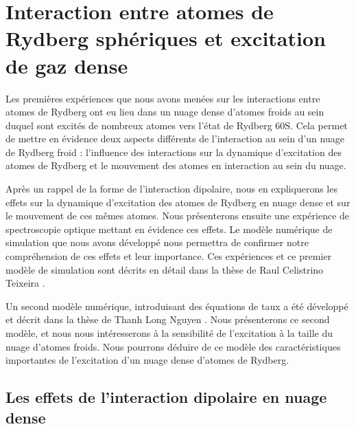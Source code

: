 \chapter{Interaction entre atomes de Rydberg sphériques et excitation de gaz dense}
\label{chapter:60s}
\vfill
\minitoc
\newpage

\noindent Les premières expériences que nous avons menées sur les interactions entre atomes de Rydberg ont eu lieu dans un nuage dense d'atomes froids au sein duquel sont excités de nombreux atomes vers l'état de Rydberg $\mathrm{60S}$.
Cela permet de mettre en évidence deux aspects différents de l'interaction au sein d'un nuage de Rydberg froid : l'influence des interactions sur la dynamique d'excitation des atomes de Rydberg et le mouvement des atomes en interaction au sein du nuage.

Après un rappel de la forme de l'interaction dipolaire, nous en expliquerons les effets sur la dynamique d'excitation des atomes de Rydberg en nuage dense et sur le mouvement de ces mêmes atomes.
Nous présenterons ensuite une expérience de spectroscopie optique mettant en évidence ces effets.
Le modèle numérique de simulation que nous avons développé nous permettra de confirmer notre compréhension de ces effets et leur importance.
Ces expériences et ce premier modèle de simulation sont décrits en détail dans la thèse de Raul Celistrino Teixeira \cite{PHD_CELISTRINO}.

Un second modèle numérique, introduisant des équations de taux a été développé et décrit dans la thèse de Thanh Long Nguyen \cite{PHD_NGUYEN}.
Nous présenterons ce second modèle, %
et nous nous intéresserons à la sensibilité de l'excitation à la taille du nuage d'atomes froids.
Nous pourrons déduire de ce modèle des caractéristiques importantes de l'excitation d'un nuage dense d'atomes de Rydberg.

\section{Les effets de l'interaction dipolaire en nuage dense}


